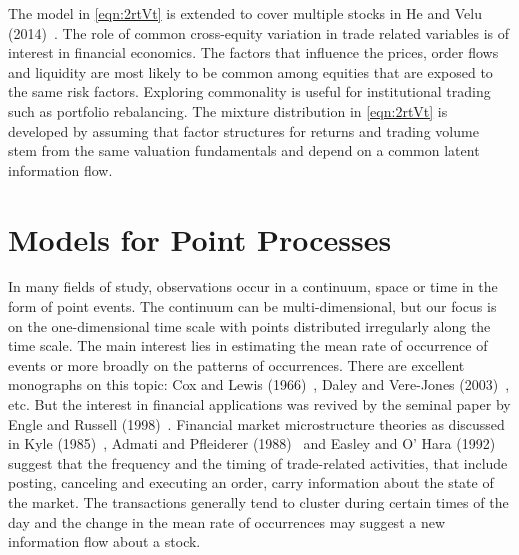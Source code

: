 The model in \eqref{eqn:2rtVt} is extended to cover multiple stocks in He and Velu (2014)~\cite{hevelu}. The role of common cross-equity variation in trade related variables is of interest in financial economics. The factors that influence the prices, order flows and liquidity are most likely to be common among equities that are exposed to the same risk factors. Exploring commonality is useful for institutional trading such as portfolio rebalancing. The mixture distribution in \eqref{eqn:2rtVt} is developed by assuming that factor structures for returns and trading volume stem from the same valuation fundamentals and depend on a common latent information flow. \label{in:volvol2} \label{in:style6}



\section{Models for Point Processes} \label{in:point1}

In many fields of study, observations occur in a continuum, space or time in the form of point events. The continuum can be multi-dimensional, but our focus is on the one-dimensional time scale with points distributed irregularly along the time scale. The main interest lies in estimating the mean rate of occurrence of events or more broadly on the patterns of occurrences. There are excellent monographs on this topic: Cox and Lewis (1966)~\cite{cox1966}, Daley and Vere-Jones (2003)~\cite{daley2003}, etc. But the interest in financial applications was revived by the seminal paper by Engle and Russell (1998)~\cite{engle1998}. Financial market microstructure theories as discussed in Kyle (1985)~\cite{kyle1985}, Admati and Pfleiderer (1988)~\cite{admati1988theory} and Easley and O' Hara (1992)~\cite{easley1992} suggest that the frequency and the timing of trade-related activities, that include posting, canceling and executing an order, carry information about the state of the market. The transactions generally tend to cluster during certain times of the day and the change in the mean rate of occurrences may suggest a new information flow about a stock.


